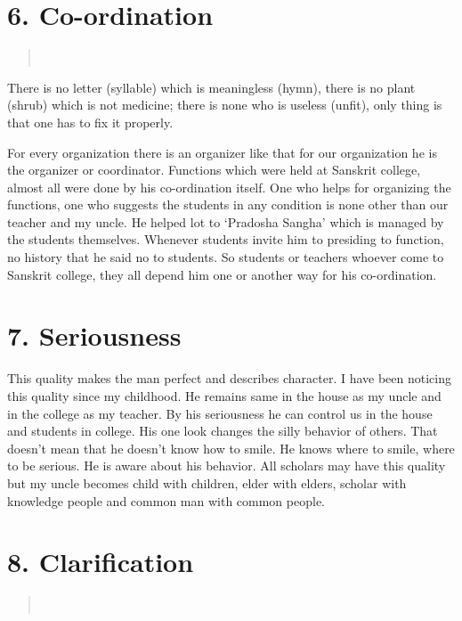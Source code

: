 \section*{6. Co-ordination }

\begin{verse}
\\
\end{verse}
There is no letter (syllable) which is meaningless (hymn), there is no plant (shrub) which is not medicine; there is none who is useless (unfit), only thing is that one has to fix it properly.

For every organization there is an organizer like that for our organization he is the organizer or coordinator. Functions which were held at Sanskrit college, almost all were done by his co-ordination itself. One who helps for organizing the functions, one who suggests the students in any condition is none other than our teacher and my uncle.
He helped lot to ‘Pradosha Sangha’ which is managed by the students themselves. Whenever students invite him to presiding to function, no history that he said no to students. So students or teachers whoever come to Sanskrit college, they all depend him one or another way for his co-ordination.

\section*{7. Seriousness }

This quality makes the man perfect and describes character. I have been noticing this quality since my childhood. He remains same in the house as my uncle and in the college as my teacher. By his seriousness he can control us in the house and students in college. His one look changes the silly behavior of others. That doesn’t mean that he doesn’t know how to smile. He knows where to smile, where to be serious. He is aware about his behavior. All scholars may have this quality but my uncle becomes child with children, elder with elders, scholar with knowledge people and common man with common people.

\section*{8. Clarification }

\begin{verse}
\\
\end{verse}
\newpage

